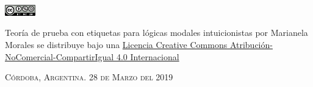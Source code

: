 \documentclass[a4paper,12pt,oneside,spanish]{book}
\begin{document}
\begin{titlepage}
\begin{center}
\includegraphics[width=0.1\textwidth]{icono.png}


Teoría de prueba con etiquetas para lógicas modales intuicionistas por Marianela Morales se distribuye bajo una \href{https://creativecommons.org/licenses/by-nc-sa/4.0/}{Licencia Creative Commons Atribución-NoComercial-CompartirIgual 4.0 Internacional}

\end{center}

\vspace*{\fill}
\textsc{Córdoba, Argentina. \hspace*{\fill} 28 de Marzo del 2019}

\end{titlepage}











\tableofcontents

\clearpage\mbox{}\clearpage









%
% 
% 
% 



%
%





\end{document}
